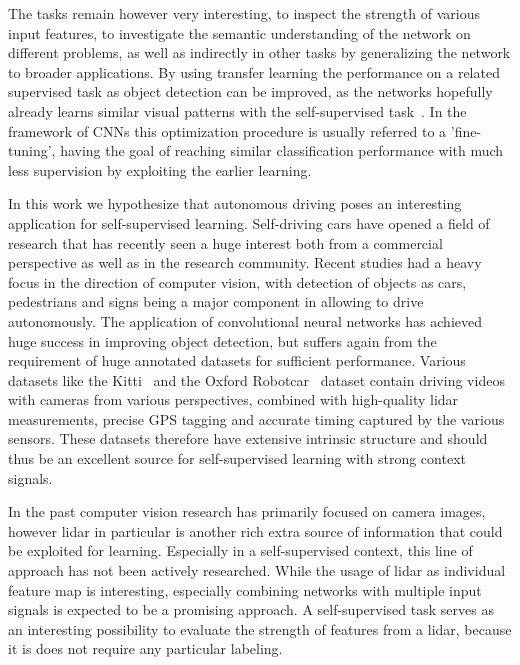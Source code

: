 The tasks remain however very interesting, to inspect the strength of various input features, to investigate the semantic understanding of the network on different problems, as well as indirectly in other tasks by generalizing the network to broader applications. By using transfer learning the performance on a related supervised task as object detection can be improved, as the networks hopefully already learns similar visual patterns with the self-supervised task~\cite{raina2007}. In the framework of CNNs this optimization procedure is usually referred to a 'fine-tuning', having the goal of reaching similar classification performance with much less supervision by exploiting the earlier learning.

In this work we hypothesize that autonomous driving poses an interesting application for self-supervised learning. Self-driving cars have opened a field of research that has recently seen a huge interest both from a commercial perspective as well as in the research community. Recent studies had a heavy focus in the direction of computer vision, with detection of objects as cars, pedestrians and signs being a major component in allowing to drive autonomously. The application of convolutional neural networks has achieved huge success in improving object detection\cite{bojarski2016end}, but suffers again from the requirement of huge annotated datasets for sufficient performance. Various datasets like the Kitti~\cite{geiger2012} and the Oxford Robotcar~\cite{maddern2017} dataset contain driving videos with cameras from various perspectives, combined with high-quality lidar measurements, precise GPS tagging and accurate timing captured by the various sensors. These datasets therefore have extensive intrinsic structure and should thus be an excellent source for self-supervised learning with strong context signals. 

In the past computer vision research has primarily focused on camera images, however lidar in particular is another rich extra source of information that could be exploited for learning. Especially in a self-supervised context, this line of approach has not been actively researched. While the usage of lidar as individual feature map is interesting, especially combining networks with multiple input signals is expected to be a promising approach. A self-supervised task serves as an interesting possibility to evaluate the strength of features from a lidar, because it is does not require any particular labeling.

